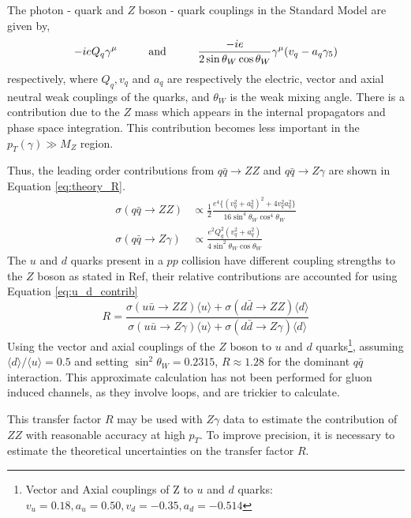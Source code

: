 \documentclass[11pt,a4paper,openright,twoside]{report}
\begin{document}
The photon - quark and $Z$ boson - quark couplings in the Standard Model are given by,
\begin{equation}
	-ieQ_q\gamma^{\mu} \hspace{1 cm} \text{and} \hspace{1 cm}\frac{-ie}{2 \sin\theta_W \cos\theta_W}\gamma^{\mu}(v_q - a_q\gamma_5)
\end{equation}
respectively, where $Q_q,v_q$ and $a_q$ are respectively the electric, vector and axial neutral weak couplings of the quarks, and $\theta_W$ is the weak mixing angle. There is a contribution due to the $Z$ mass which appears in the internal propagators and phase space integration. This contribution becomes less important in the $p_T(\gamma)\gg M_Z$ region.

Thus, the leading order contributions from $q\bar{q}\rightarrow ZZ$ and $q\bar{q}\rightarrow Z\gamma$ are shown in Equation \ref{eq:theory_R}.
\begin{equation}
\begin{split}
	\sigma(q\bar{q}\rightarrow ZZ) &\propto \frac{1}{2}\frac{e^4\{(v_q^2 + a_q^2)^2 + 4v_q^2a_q^2\} }{16\sin^4\theta_W\cos^4\theta_W}\\[1.5ex]
	\sigma(q\bar{q}\rightarrow Z\gamma) &\propto \frac{e^2Q_q^2(v^2_q + a^2_q)}{4\sin^2\theta_W\cos\theta_W}
\end{split}
\label{eq:theory_R}
\end{equation}
The $u$ and $d$ quarks present in a $pp$ collision have different coupling strengths to the $Z$ boson as stated in Ref\cite{Z_coupling}, their relative contributions are accounted for using Equation \ref{eq:u_d_contrib}
\begin{equation}
R = \frac{\sigma(u\bar{u}\rightarrow ZZ)\langle u\rangle + \sigma(d\bar{d}\rightarrow ZZ)\langle d\rangle}{\sigma(u\bar{u}\rightarrow Z\gamma)\langle u\rangle + \sigma(d\bar{d}\rightarrow Z\gamma)\langle d\rangle}
\label{eq:u_d_contrib}
\end{equation}
Using the vector and axial couplings of the $Z$ boson to $u$ and $d$ quarks\footnote{Vector and Axial couplings of Z to $u$ and $d$ quarks: $v_u = 0.18, a_u = 0.50, v_d = -0.35, a_d = -0.514$}, assuming $\langle d \rangle/\langle u\rangle = 0.5$ and setting $\sin^2\theta_W = 0.2315$, $R\approx 1.28$ for the dominant $q\bar{q}$ interaction. This approximate calculation has not been performed for gluon induced channels, as they involve loops, and are trickier to calculate.

This transfer factor $R$ may be used with $Z\gamma$ data to estimate the contribution of $ZZ$ with reasonable accuracy at high $p_T$. To improve precision, it is necessary to estimate the theoretical uncertainties on the transfer factor $R$.
\end{document}
